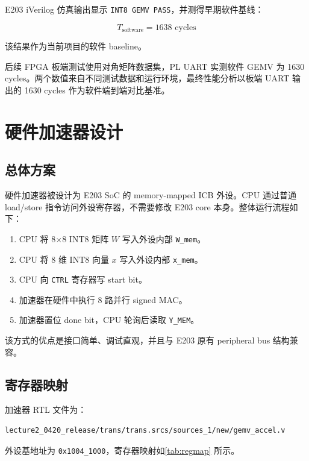 \documentclass[12pt, a4paper]{article}
\begin{document}
E203 iVerilog 仿真输出显示 \texttt{INT8 GEMV PASS}，并测得早期软件基线：

\begin{equation}
    T_{\text{software}} = 1638 \text{ cycles}
\end{equation}

该结果作为当前项目的软件 baseline。

后续 FPGA 板端测试使用对角矩阵数据集，PL UART 实测软件 GEMV 为 1630 cycles。两个数值来自不同测试数据和运行环境，最终性能分析以板端 UART 输出的 1630 cycles 作为软件端到端对比基准。

\section{硬件加速器设计}

\subsection{总体方案}

硬件加速器被设计为 E203 SoC 的 memory-mapped ICB 外设。CPU 通过普通 load/store 指令访问外设寄存器，不需要修改 E203 core 本身。整体运行流程如下：

\begin{enumerate}
    \item CPU 将 8$\times$8 INT8 矩阵 $W$ 写入外设内部 \texttt{W\_mem}。
    \item CPU 将 8 维 INT8 向量 $x$ 写入外设内部 \texttt{x\_mem}。
    \item CPU 向 \texttt{CTRL} 寄存器写 start bit。
    \item 加速器在硬件中执行 8 路并行 signed MAC。
    \item 加速器置位 done bit，CPU 轮询后读取 \texttt{Y\_MEM}。
\end{enumerate}

该方式的优点是接口简单、调试直观，并且与 E203 原有 peripheral bus 结构兼容。

\subsection{寄存器映射}

加速器 RTL 文件为：

\begin{lstlisting}[caption={GEMV 加速器 RTL 文件路径}]
lecture2_0420_release/trans/trans.srcs/sources_1/new/gemv_accel.v
\end{lstlisting}

外设基地址为 \texttt{0x1004\_1000}，寄存器映射如\cref{tab:regmap} 所示。
\end{document}

